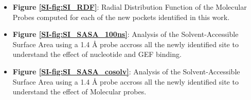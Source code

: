 \documentclass[12pt,a4paper]{achemso}
\begin{document}
\begin{suppinfo}
\begin{itemize}
    \item \textbf{Figure \ref{SI-fig:SI_RDF}}: Radial Distribution Function of the Molecular Probes computed for each of the new pockets identified in this work.
    \item \textbf{Figure \ref{SI-fig:SI_SASA_100ns}}: Analysis of the Solvent-Accessible Surface Area using a 1.4 \r{A} probe accross all the newly identified site to understand the effect of nucleotide and GEF binding.
    \item \textbf{Figure \ref{SI-fig:SI_SASA_cosolv}}: Analysis of the Solvent-Accessible Surface Area using a 1.4 \r{A} probe accross all the newly identified site to understand the effect of Molecular probes.

\end{itemize}
\end{suppinfo}

 
\end{document}
